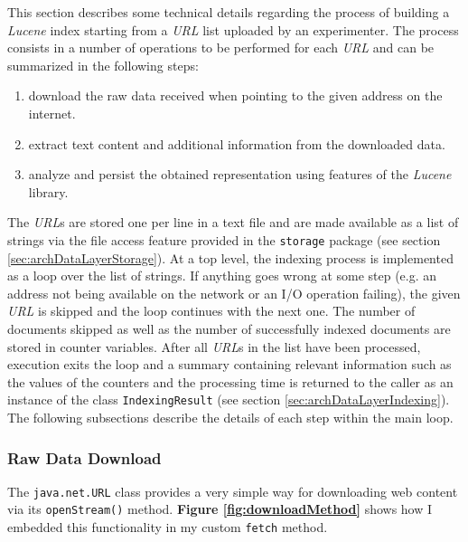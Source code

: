 \documentclass[a4paper]{usiinfbachelorproject}
\begin{document}
This section describes some technical details regarding the process of building a \emph{Lucene} index starting from
a \emph{URL} list uploaded by an experimenter. The process consists in a number of operations to be performed
for each \emph{URL} and can be summarized in the following steps:

    \begin{enumerate}

        \item download the raw data received when pointing to the given address on the internet. 

        \item extract text content and additional information from the downloaded data.

        \item analyze and persist the obtained representation using features of the \emph{Lucene} library.

    \end{enumerate}

The \emph{URL}s are stored one per line in a text file and are made available as a list of strings via
the file access feature provided in the \texttt{storage} package (see section \ref{sec:archDataLayerStorage}).
At a top level, the indexing process is implemented as a loop over the list of strings. If anything goes wrong
at some step (e.g. an address not being available on the network or an I/O operation failing), the given
\emph{URL} is skipped and the loop continues with the next one. The number of documents skipped as well as the
number of successfully indexed documents are stored in counter variables. After all \emph{URL}s in the list have
been processed, execution exits the loop and a summary containing relevant information such as the values
of the counters and the processing time is returned to the caller as an instance of the class 
\texttt{IndexingResult} (see section \ref{sec:archDataLayerIndexing}).
The following subsections describe the details of each step within the main loop.

\subsubsection{Raw Data Download}

The \texttt{java.net.URL} class provides a very simple way for downloading web content via its 
\texttt{openStream()} method. \textbf{Figure \ref{fig:downloadMethod}} shows how I embedded
this functionality in my custom \texttt{fetch} method.
\end{document}
